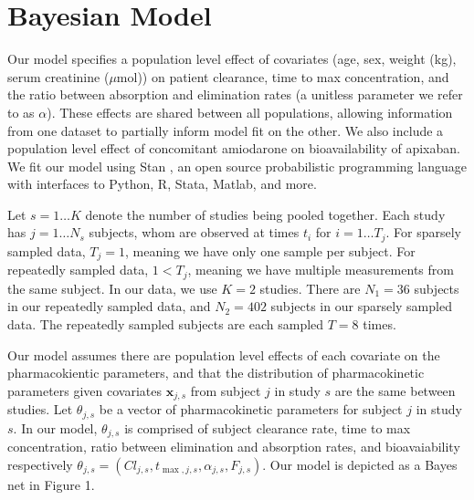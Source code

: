 \section{Bayesian Model}


Our model specifies a population level effect of covariates (age, sex, weight (kg), serum creatinine ($\mu \mbox{mol}$)) on patient clearance, time to max concentration, and the ratio between absorption and elimination rates (a unitless parameter we refer to as $\alpha$). These effects are shared between all populations, allowing information from one dataset to partially inform model fit on the other.  We also include a population level effect of concomitant amiodarone on bioavailability of apixaban.  We fit our model using Stan \cite{gelman2015stan}, an open source probabilistic programming language with interfaces to Python, R, Stata, Matlab, and more.

Let $s = 1 \dots K$ denote the number of studies being pooled together.  Each study has $j = 1 \dots N_s$ subjects, whom are observed at times $t_i$ for $i = 1 \dots T_j$.  For sparsely sampled data, $T_j=1$, meaning we have only one sample per subject.  For repeatedly sampled data, $1<T_j$, meaning we have multiple measurements from the same subject.  In our data, we use $K=2$ studies.  There are $N_1=36$ subjects in our repeatedly sampled data, and $N_2=402$ subjects in our sparsely sampled data.  The repeatedly sampled subjects are each sampled $T=8$ times.

Our model assumes there are population level effects of each covariate on the pharmacokientic parameters, and that the distribution of pharmacokinetic parameters given covariates $\mathbf{x}_{j, s}$ from subject $j$ in study $s$ are the same between studies.  Let $\theta_{j, s}$ be a vector of pharmacokinetic parameters for subject $j$ in study $s$.  In our model, $\theta_{j, s}$ is comprised of subject clearance rate, time to max concentration, ratio between elimination and absorption rates, and bioavaiability respectively  $\theta_{j,s} = (\mathit{Cl}_{j, s}, t_{\max, j, s}, \alpha_{j, s}, F_{j, s})$.  Our model is depicted as a Bayes net in Figure 1.

